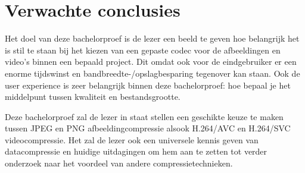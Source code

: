 \section{Verwachte conclusies}
\label{sec:verwachte_conclusies}

Het doel van deze bachelorproef is de lezer een beeld te geven hoe belangrijk het is stil te staan bij het kiezen van een gepaste codec voor de afbeeldingen en video's binnen een bepaald project. Dit omdat ook voor de eindgebruiker er een enorme tijdswinst en bandbreedte-/opslagbesparing tegenover kan staan. Ook de user experience is zeer belangrijk binnen deze bachelorproef: hoe bepaal je het middelpunt tussen kwaliteit en bestandsgrootte. 

Deze bachelorproef zal de lezer in staat stellen een geschikte keuze te maken tussen JPEG en PNG afbeeldingcompressie alsook H.264/AVC en H.264/SVC videocompressie. Het zal de lezer ook een universele kennis geven van datacompressie en huidige uitdagingen om hem aan te zetten tot verder onderzoek naar het voordeel van andere compressietechnieken. 